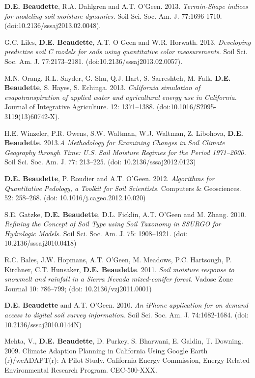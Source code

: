 \documentclass[overlapped,line,10pt,letterpaper]{res}
\begin{document}
\begin{resume}
\textbf{D.E. Beaudette}, R.A. Dahlgren and A.T. O'Geen. 2013. {\em Terrain-Shape indices for 
modeling soil moisture dynamics.} Soil Sci. Soc. Am. J. 77:1696-1710. (doi:10.2136/sssaj2013.02.0048).

G.C. Liles, \textbf{D.E. Beaudette}, A.T. O Geen and W.R. Horwath. 2013. {\em Developing predictive soil C models for soils using quantitative color measurements.} Soil Sci. Soc. Am. J. 77:2173--2181. (doi:10.2136/sssaj2013.02.0057).

M.N. Orang, R.L. Snyder, G. Shu, Q.J. Hart, S. Sarreshteh, M. Falk, \textbf{D.E. Beaudette}, S. Hayes, S. Echinga. 2013. {\em California simulation of evapotranspiration of applied water and agricultural energy use in California.} Journal of Integrative Agriculture. 12: 1371--1388. (doi:10.1016/S2095-3119(13)60742-X).

H.E. Winzeler, P.R. Owens, S.W. Waltman, W.J. Waltman, Z. Libohova, \textbf{D.E. Beaudette}. 2013.{\em A Methodology for Examining Changes in Soil Climate Geography through Time: U.S. Soil Moisture Regimes for the Period 1971--2000.} Soil Sci. Soc. Am. J. 77: 213--225. (doi: 10.2136/sssaj2012.0123)

\textbf{D.E. Beaudette}, P. Roudier and A.T. O'Geen. 2012. {\em Algorithms for Quantitative Pedology, a Toolkit for Soil Scientists.} Computers \& Geosciences. 52: 258--268. (doi: 10.1016/j.cageo.2012.10.020)

S.E. Gatzke, \textbf{D.E. Beaudette}, D.L. Ficklin, A.T. O'Geen and M. Zhang. 2010. {\em Refining the Concept of Soil Type using Soil Taxonomy in SSURGO for Hydrologic Models.} Soil Sci. Soc. Am. J. 75: 1908--1921. (doi: 10.2136/sssaj2010.0418)

R.C. Bales, J.W. Hopmans, A.T. O'Geen, M. Meadows, P.C. Hartsough, P. Kirchner, C.T. Hunsaker, \textbf{D.E. Beaudette}. 2011. {\em Soil moisture response to snowmelt and rainfall in a Sierra Nevada mixed-conifer forest.} Vadose Zone Journal 10: 786--799; (doi: 10.2136/vzj2011.0001)

\textbf{D.E. Beaudette} and A.T. O'Geen. 2010. {\em An iPhone application for on demand access to digital soil survey information.} Soil Sci. Soc. Am. J. 74:1682-1684. (doi: 10.2136/sssaj2010.0144N)

Mehta, V., \textbf{D.E. Beaudette}, D. Purkey, S. Bharwani, E. Galdin, T. Downing. 2009. Climate Adaption 
Planning in California Using Google Earth (r)/weADAPT(r):  A Pilot Study. California Energy 
Commission, Energy-Related Environmental Research Program. CEC-500-XXX.


\end{resume}
\end{document}
